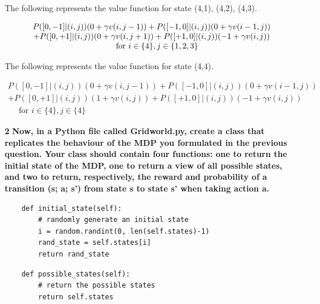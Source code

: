 \documentclass[11pt]{article}
\begin{document}
\noindent
The following represents the value function for state (4,1), (4,2), (4,3).

\begin{equation}
\begin{array}{c}
{P([0,-1] |(i,j))(0+\gamma v(i, j-1))+P([-1,0] |(i, j))(0+\gamma v(i-1, j))} \\
{+P([0,+1] |(i, j))(0+\gamma v(i, j+1))+P([+1,0] |(i, j))(-1+\gamma v(i, j))}\\
{\quad \text { for } i \in\{4\}, j \in\{1,2,3\}}
\end{array}\\
\end{equation}

\noindent
The following represents the value function for state (4,4).

\begin{equation}
\begin{array}{c}
{P([0,-1] |(i, j))(0+\gamma v(i, j-1))+P([-1,0]|(i, j))(0+\gamma v(i-1, j))} \\
{+P([0,+1]|(i, j))(1+\gamma v(i, j))+P([+1,0]|(i,j))(-1+\gamma v(i, j))} \\
{\quad \text { for } i \in\{4\}, j \in\{4\}}
\end{array}
\end{equation}


\noindent
\textbf{2}
\noindent
\textbf{Now, in a Python file called Gridworld.py, create a class that replicates
the behaviour of the MDP you formulated in the previous question. Your class
should contain four functions: one to return the initial state of the MDP, one to
return a view of all possible states, and two to return, respectively, the reward and
probability of a transition (s; a; s') from state s to state s' when taking action a.}
\\

\lstset{language=Python}
\lstset{frame=lines}
\lstset{basicstyle=\footnotesize}
\begin{lstlisting}
    def initial_state(self):
        # randomly generate an initial state
        i = random.randint(0, len(self.states)-1)
        rand_state = self.states[i]
        return rand_state
\end{lstlisting}

\lstset{basicstyle=\footnotesize}
\begin{lstlisting}
    def possible_states(self):
        # return the possible states
        return self.states
\end{lstlisting}
\end{document}
